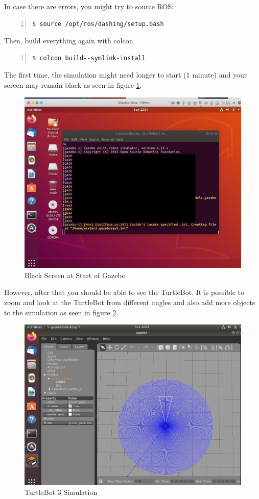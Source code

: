 \documentclass[plainarticle,zihtitle,english,final,hyperref,utf8]{zihpub}
\begin{document}
In case there are errors, you might try to source ROS:
        \begin{Verbatim}[breaklines=true, breakanywhere=true, baselinestretch=1,fontsize=\scriptsize,numbers=left,frame=single,stepnumber=5,xleftmargin=1cm,xrightmargin=1cm]
$ source /opt/ros/dashing/setup.bash
        \end{Verbatim}
Then, build everything again with colcon
        \begin{Verbatim}[breaklines=true, breakanywhere=true, baselinestretch=1,fontsize=\scriptsize,numbers=left,frame=single,stepnumber=5,xleftmargin=1cm,xrightmargin=1cm]
$ colcon build--symlink-install 
        \end{Verbatim}
\newpage
The first time, the simulation might need longer to start (1 minute) and your screen may remain black as seen in figure \ref{fig:blackros2vm}.
\begin{figure}[h!]
  \begin{center}
    \includegraphics[width=.65\textwidth]{BlackScreen.png}
    \caption{Black Screen at Start of Gazebo}
    \label{fig:blackros2vm}
  \end{center}
\end{figure}
\newline
However, after that you should be able to see the TurtleBot. It is possible to zoom and look at the TurtleBot from different angles and also add more objects to the simulation as seen in figure \ref{fig:gazebo2vm}.\\
\begin{figure}[h!]
  \begin{center}
    \includegraphics[width=.65\textwidth]{TurtlebotROS2Simulation.png}
    \caption{TurtleBot 3 Simulation}
    \label{fig:gazebo2vm}
  \end{center}
\end{figure}
\end{document}
